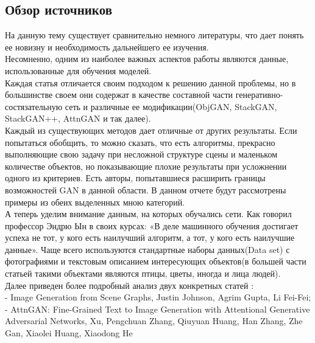 \documentclass{article}
\begin{document}
    \newpage
    \begin{center} 
    \section{Обзор источников}
    \end{center} 
    \large 
    На данную тему существует сравнительно немного литературы, что дает понять ее новизну и необходимость дальнейшего ее изучения.\\
    Несомненно, одним из наиболее важных аспектов работы являются данные, использованные для обучения моделей.\\
    Каждая статья отличается своим подходом к решению данной проблемы, но в большинстве своем они содержат в качестве составной части генеративно-состязательную сеть и различные ее модификации(ObjGAN, StackGAN, StackGAN++, AttnGAN и так далее).\\
    Каждый из существующих методов дает отличные от других результаты. Если попытаться обобщить, то можно сказать, что есть алгоритмы, прекрасно выполняющие свою задачу при несложной структуре сцены и маленьком количестве объектов, но показывающие плохие результаты при усложнении одного из критериев. Есть авторы, попытавшиеся расширить границы возможностей GAN в данной области. В данном отчете будут рассмотрены примеры из обеих выделенных мною категорий.\\
    А теперь уделим внимание данным, на которых обучались сети. Как говорил профессор Эндрю Ын в своих курсах: «В деле машинного обучения достигает успеха не тот, у кого есть наилучший алгоритм, а тот, у кого есть наилучшие данные». 
    Чаще всего используются стандартные наборы данных(Data set) с фотографиями и текстовым описанием интересующих объектов(в большей части статьей такими объектами являются птицы, цветы, иногда и лица людей).\\
    Далее приведен более подробный анализ двух конкретных статей :\\  - Image Generation from Scene Graphs, Justin Johnson, Agrim Gupta, Li Fei-Fei;\\  - AttnGAN: Fine-Grained Text to Image Generation
with Attentional Generative Adversarial Networks, Xu, Pengchuan Zhang, Qiuyuan Huang, Han Zhang, Zhe Gan, Xiaolei Huang, Xiaodong He
    
\end{document}
